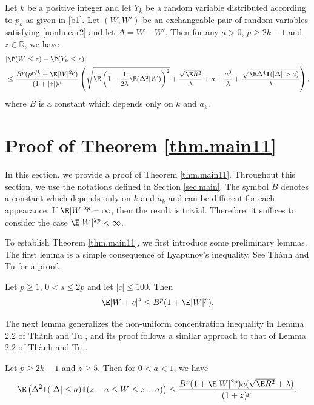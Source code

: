 	\begin{theorem}\label{thm.main11} 
		Let $k$ be a positive integer and let $Y_k$ be a random variable distributed according to $p_k$ as given in \eqref{b1}.
		Let $(W, W')$ be an exchangeable pair of random variables satisfying \eqref{nonlinear2} and let $\Delta=W-W'$. 
		Then for any $a>0$, $p\ge 2k-1$ and $z\in\mathbb{R}$, we have
		\begin{equation*}
			\begin{split}
				&|\P(W\le z) - \P(Y_k\le z)| \\
				&\le\frac{B^p(p^{p/k}+\E |W|^{2p})}{(1+|z|)^{p} } \left(\sqrt{\E\left( 1- \frac{1}{2\lambda}\E({\Delta}^2|W)\right)^2} +\dfrac{\sqrt{\E R^2}}{\lambda} 
				+  a +\frac{ a^3}{\lambda}+ \dfrac{\sqrt{\E\Delta^4\mathbf{1}(|\Delta|>a)}}{\lambda}\right),
			\end{split}
		\end{equation*}
		where $B$ is a constant which depends only on $k$ and $a_k$. 
		
	\end{theorem}
	
	\section{Proof of Theorem \ref{thm.main11}}\label{sec.proof}
	In this section, we provide a proof of Theorem \ref{thm.main11}. Throughout this section, we use the notations defined in Section \ref{sec.main}. 
	The symbol $B$ denotes a constant which depends only on $k$ and $a_k$ and can be different for each appearance. 
	If $\E|W|^{2p}=\infty$, then the result is trivial. Therefore, it suffices to consider the case $\E|W|^{2p}<\infty$.
	
	To establish Theorem \ref{thm.main11}, we first introduce some preliminary lemmas.
	The first lemma is a simple consequence of Lyapunov's inequality. See
	Th\`{a}nh and Tu \cite{thanh2025non} for a proof.
	\begin{lemma}\label{lem.bound.moment.W} 
		Let $p\ge 1$, $0<s\le 2p$ and let $|c|\le 100$. Then
		\begin{equation}\label{estimate.moment.W01}
			\E|W+c|^s\le B^p(1+\E|W|^{p}).
		\end{equation}
	\end{lemma} 
	
	The next lemma generalizes the non-uniform concentration inequality in Lemma 2.2 of 
	Th\`{a}nh and Tu \cite{thanh2025non}, and its proof follows a similar approach to that of 
	Lemma 2.2 of Th\`{a}nh and Tu \cite{thanh2025non}.
	\begin{lemma}\label{lem.concentration.inequality} 
		Let $p\ge 2k-1$ and $z \ge 5$. Then for $0<a< 1$, we have
		\begin{equation} \label{T322a}
			\E \left(\Delta^2\mathbf{1}(|\Delta|\le a)\mathbf{1}(z-a \le W \le z+a)\right) \le \dfrac{B^{p}(1+\E|W|^{2p})a(\sqrt{\E R^2} + \lambda)}{(1+z)^p}.
		\end{equation}
	\end{lemma} 
	

